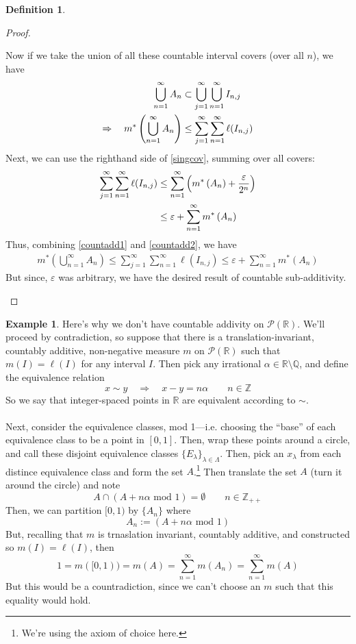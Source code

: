 \documentclass[12pt]{article}
\theoremstyle{plain}
\theoremstyle{definition}
\newtheorem{defn}[thm]{Definition}
\newtheorem{ex}[thm]{Example}
\theoremstyle{remark}
\begin{document}
\begin{defn}
\begin{proof}
\begin{enumerate}
Now if we take the union of all these countable interval covers (over all $n$), we have 
\begin{align}
    \bigcup^\infty_{n=1}A_n &\subset 
        \bigcup^\infty_{j=1} 
        \bigcup^\infty_{n=1} I_{n,j} \notag\\
    \Rightarrow \quad
    m^*\left(\bigcup^\infty_{n=1}A_n\right) 
    &\leq \sum^\infty_{j=1} \sum^\infty_{n=1}\ell(I_{n,j})
    \label{countadd1}
\end{align}
Next, we can use the righthand side of \ref{singcov}, summing over all covers:
\begin{align}
    \sum^\infty_{j=1} \sum^\infty_{n=1}\ell(I_{n,j})
    &\leq \sum^\infty_{n=1} \left(m^*\left(A_n\right) 
    + \frac{\varepsilon}{2^n}\right) \notag \\
    &\leq \varepsilon
    +\sum^\infty_{n=1} m^*\left(A_n\right) 
    \label{countadd2}
\end{align}
Thus, combining \ref{countadd1} and \ref{countadd2}, we have
\begin{align}
    m^*\left(\bigcup^\infty_{n=1}A_n\right) 
    \leq \sum^\infty_{j=1} \sum^\infty_{n=1}\ell(I_{n,j})
    \leq \varepsilon+\sum^\infty_{n=1} m^*\left(A_n\right)
\end{align}
But since, $\varepsilon$ was arbitrary, we have the desired result of countable sub-additivity.
\end{enumerate}
\end{proof}
\end{defn}


\begin{ex}
Here's why we don't have countable addivity on $\mathscr{P}(\mathbb{R})$. We'll proceed by contradiction, so suppose that there is a translation-invariant, countably additive, non-negative measure $m$ on $\mathscr{P}(\mathbb{R})$ such that $m(I)=\ell(I)$ for any interval $I$. Then pick any irrational $\alpha\in\mathbb{R}\setminus\mathbb{Q}$, and define the equivalence relation
\[
    x\sim y 
    \quad \Rightarrow \quad
    x-y = n \alpha \qquad n \in\mathbb{Z}
\]
So we say that integer-spaced points in $\mathbb{R}$ are equivalent according to $\sim$. 
\\
\\
Next, consider the equivalence classes, mod 1---i.e. choosing the ``base'' of each equivalence class to be a point in $[0,1]$. Then, wrap these points around a circle, and call these disjoint equivalence classes $\{E_\lambda\}_{\lambda \in \Lambda}$. Then, pick an $x_\lambda$ from each distince equivalence class and form the set $A$.\footnote{We're using the axiom of choice here.} Then translate the set $A$ (turn it around the circle) and note
\[
    A \cap (A + n \alpha \text{ mod } 1 ) = \emptyset
    \qquad n \in \mathbb{Z}_{++}
\]
Then, we can partition $[0,1)$ by $\{A_n\}$ where
\[
    A_n := (A + n\alpha \text{ mod } 1)
\]
But, recalling that $m$ is trnaslation invariant, countably additive, and constructed so $m(I)=\ell(I)$, then
\[
    1 = m([0,1)) = m(A) = \sum^\infty_{n=1} m(A_n) = 
    \sum^\infty_{n=1} m(A) 
\]
But this would be a countradiction, since we can't choose an $m$ such that this equality would hold.

\end{ex}
\end{document}
